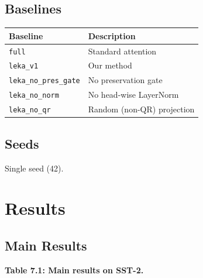 \subsection{Baselines}

\begin{table}[H]
\centering
\small
\begin{tabular}{ll}
\toprule
\textbf{Baseline} & \textbf{Description} \\
\midrule
\texttt{full} & Standard attention \\
\texttt{leka\_v1} & Our method \\
\texttt{leka\_no\_pres\_gate} & No preservation gate \\
\texttt{leka\_no\_norm} & No head-wise LayerNorm \\
\texttt{leka\_no\_qr} & Random (non-QR) projection \\
\bottomrule
\end{tabular}
\end{table}

\subsection{Seeds}

Single seed (42).



\section{Results}

\subsection{Main Results}

\textbf{Table 7.1: Main results on SST-2.}

